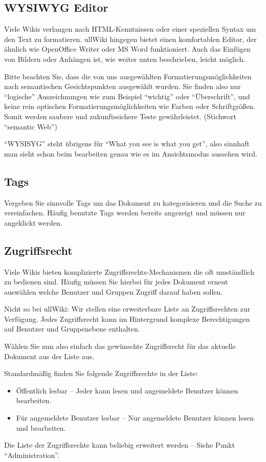 \documentclass[article, a4paper, oneside, 11pt]{memoir}
\begin{document}
\subsection{WYSIWYG Editor}
Viele Wikis verlangen nach HTML-Kenntnissen oder einer speziellen Syntax um den Text zu formatieren. ullWiki hingegen bietet einen komfortablen Editor, der ähnlich wie OpenOffice Writer oder MS Word funktioniert. Auch das Einfügen von Bildern oder Anhängen ist, wie weiter unten beschrieben, leicht möglich.

Bitte beachten Sie, dass die von uns ausgewählten Formatierungsmöglichkeiten nach semantischen Gesichtspunkten ausgewählt wurden. Sie finden also nur "`logische"' Auszeichnungen wie zum Beispiel "`wichtig"' oder "`Überschrift"', und keine rein optischen Formatierungsmöglichkeiten wie Farben oder Schriftgrößen. Somit werden saubere und zukunftssichere Teste gewährleistet. (Stichwort "`semantic Web"')

"`WYSISYG"' steht übrigens für "`What you see is what you get"', also sinnhaft man sieht schon beim bearbeiten genau wie es im Ansichtsmodus aussehen wird.

\subsection{Tags}
Vergeben Sie sinnvolle Tags um das Dokument zu kategorisieren und die Suche zu vereinfachen. Häufig benutzte Tags werden bereits angezeigt und müssen nur angeklickt werden.

\subsection{Zugriffsrecht}
Viele Wikis bieten komplizierte Zugriffsrechts-Mechanismen die oft umständlich zu bedienen sind. Häufig müssen Sie hierbei für jedes Dokument erneut auswählen welche Benutzer und Gruppen Zugriff darauf haben sollen.

Nicht so bei ullWiki: Wir stellen eine erweiterbare Liste an Zugriffsrechten zur Verfügung. Jedes Zugriffsrecht kann im Hintergrund komplexe Berechtigungen auf Benutzer und Gruppenebene enthalten.

Wählen Sie nun also einfach das gewünschte Zugriffsrecht für das aktuelle Dokument aus der Liste aus.

Standardmäßig finden Sie folgende Zugriffsrechte in der Liste:

\begin{itemize}
\item Öffentlich lesbar – Jeder kann lesen und angemeldete Benutzer können bearbeiten.
\item Für angemeldete Benutzer lesbar – Nur angemeldete Benutzer können lesen und bearbeiten.
\end{itemize}
Die Liste der Zugriffsrechte kann beliebig erweitert werden – Siehe Punkt "`Administration"'.
\end{document}

